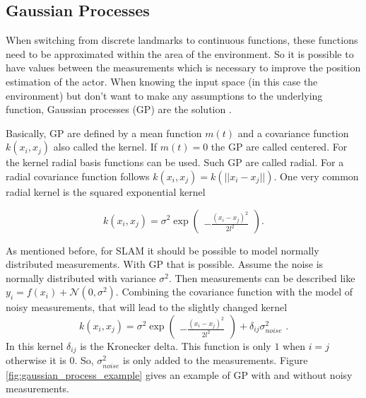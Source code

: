 \subsection{Gaussian Processes}

When switching from discrete landmarks to continuous functions, these functions need to be approximated within the area of the environment. So it is possible to have values between the measurements which is necessary to improve the position estimation of the actor. When knowing the input space (in this case the environment) but don't want to make any assumptions to the underlying function, Gaussian processes (GP) are the solution \cite{ebden_gaussian_2015}.

Basically, GP are defined by a mean function $m(t)$ and a covariance function $k(x_i, x_j)$ also called the kernel. If $m(t) = 0$ the GP are called centered. For the kernel radial basis functions can be used. Such GP are called radial. For a radial covariance function follows $k(x_i, x_j) = k(||x_i - x_j||)$. One very common radial kernel is the squared exponential kernel \cite{ebden_gaussian_2015}

$$
k(x_i, x_j) = \sigma ^2 \exp 
\begin{pmatrix}
-\frac{(x_i - x_j)^2}{2l^2}
\end{pmatrix}\text{.}
$$

As mentioned before, for SLAM it should be possible to model normally distributed measurements. With GP that is possible. Assume the noise is normally distributed with variance $\sigma^2$. Then measurements can be described like $y_i = f(x_i) + \mathcal{N}(0, \sigma^2)$. Combining the covariance function with the model of noisy measurements, that will lead to the slightly changed kernel
$$
k(x_i, x_j) = \sigma ^2 \exp 
\begin{pmatrix}
-\frac{(x_i - x_j)^2}{2l^2}
\end{pmatrix}
+ \delta_{ij} \sigma^2_{noise}\text{ .}
$$
In this kernel $\delta_{ij}$ is the Kronecker delta. This function is only $1$ when $i=j$ otherwise it is $0$. So, $\sigma^2_{noise}$ is only added to the measurements. Figure \ref{fig:gaussian_process_example} gives an example of GP with and without noisy measurements.

